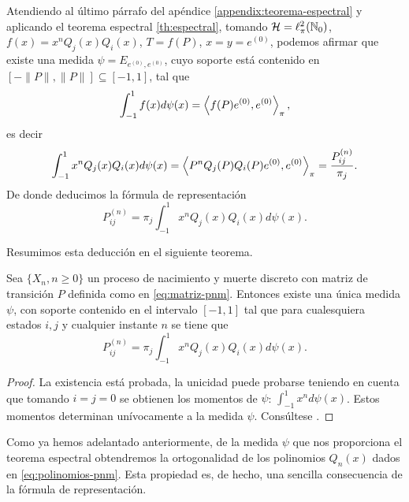     Atendiendo al último párrafo del apéndice \ref{appendix:teorema-espectral} y aplicando el teorema espectral \ref{th:espectral}, tomando $\mathcal{H}=\ell_\pi^2(\mathbb{N}_0)$, $f(x)=x^n Q_j(x)Q_i(x)$, $T=f(P)$, $x=y=e^{(0)}$, podemos afirmar que existe una medida $\psi=E_{e^{(0)},e^{(0)}}$, cuyo soporte está contenido en $[-\|P\|,\|P\|]\subseteq[-1,1]$, tal que 
    \begin{equation*}
        \int_{-1}^1 f(x)d\psi(x) = \left\langle f(P)e^{(0)} , e^{(0)} \right\rangle_\pi,
    \end{equation*}
    es decir
    \begin{equation*}
        \int_{-1}^1 x^n Q_j(x)Q_i(x)d\psi(x) = \left\langle P^n Q_j(P)Q_i(P)e^{(0)} , e^{(0)} \right\rangle_\pi = \dfrac{P_{ij}^{(n)}}{\pi_j}.
    \end{equation*}
    De donde deducimos la fórmula de representación
    \begin{equation*}
        P_{ij}^{(n)}=\pi_j \int_{-1}^1 x^n Q_j(x)Q_i(x)d\psi(x).
    \end{equation*}

    Resumimos esta deducción en el siguiente teorema.

    \begin{teorema}
        Sea $\{X_n, n\geq 0\}$ un proceso de nacimiento y muerte discreto con matriz de transición $P$ definida como en \eqref{eq:matriz-pnm}. Entonces existe una única medida $\psi$, con soporte contenido en el intervalo $[-1,1]$ tal que para cualesquiera estados $i,j$ y cualquier instante $n$ se tiene que
        \begin{equation}
            \label{eq:formula-representacion}
            P_{ij}^{(n)}=\pi_j \int_{-1}^1 x^n Q_j(x)Q_i(x)d\psi(x).
        \end{equation}
    \end{teorema}
    \begin{proof}
        La existencia está probada, la unicidad puede probarse teniendo en cuenta que tomando $i=j=0$ se obtienen los momentos de $\psi$: $\int_{-1}^1 x^n d\psi(x)$. Estos momentos determinan unívocamente a la medida $\psi$. Consúltese \cite[Theorem 1]{random-walks}.
    \end{proof}

    Como ya hemos adelantado anteriormente, de la medida $\psi$ que nos proporciona el teorema espectral obtendremos la ortogonalidad de los polinomios $Q_n(x)$ dados en \eqref{eq:polinomios-pnm}. Esta propiedad es, de hecho, una sencilla consecuencia de la fórmula de representación.


